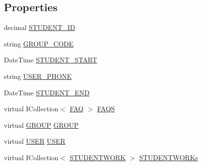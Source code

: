 \subsection*{Properties}
\begin{DoxyCompactItemize}
\item 
decimal \hyperlink{class_e_f_oracle_1_1_model_1_1_s_t_u_d_e_n_t_ac52552fb2577883bf22d24acd6263928}{S\+T\+U\+D\+E\+N\+T\+\_\+\+ID}
\item 
string \hyperlink{class_e_f_oracle_1_1_model_1_1_s_t_u_d_e_n_t_a03789daa6023e5873d86b9dde2c913a5}{G\+R\+O\+U\+P\+\_\+\+C\+O\+DE}
\item 
Date\+Time \hyperlink{class_e_f_oracle_1_1_model_1_1_s_t_u_d_e_n_t_ac98090401dae17df06850dedd8d20acf}{S\+T\+U\+D\+E\+N\+T\+\_\+\+S\+T\+A\+RT}
\item 
string \hyperlink{class_e_f_oracle_1_1_model_1_1_s_t_u_d_e_n_t_aade79c3e50cdf2b7756ab476b9cadea7}{U\+S\+E\+R\+\_\+\+P\+H\+O\+NE}
\item 
Date\+Time \hyperlink{class_e_f_oracle_1_1_model_1_1_s_t_u_d_e_n_t_ab80cc4d1a69f1a6fcc020a0b6edf608d}{S\+T\+U\+D\+E\+N\+T\+\_\+\+E\+ND}
\item 
virtual I\+Collection$<$ \hyperlink{class_e_f_oracle_1_1_model_1_1_f_a_q}{F\+AQ} $>$ \hyperlink{class_e_f_oracle_1_1_model_1_1_s_t_u_d_e_n_t_a48ab9bae6d7e36ac88346fbde34a618a}{F\+A\+QS}
\item 
virtual \hyperlink{class_e_f_oracle_1_1_model_1_1_g_r_o_u_p}{G\+R\+O\+UP} \hyperlink{class_e_f_oracle_1_1_model_1_1_s_t_u_d_e_n_t_a1082b5bfe750a1ab04c78c8e1240b8df}{G\+R\+O\+UP}
\item 
virtual \hyperlink{class_e_f_oracle_1_1_model_1_1_u_s_e_r}{U\+S\+ER} \hyperlink{class_e_f_oracle_1_1_model_1_1_s_t_u_d_e_n_t_a2b674831aaeeb5ebed3428dc914b3785}{U\+S\+ER}
\item 
virtual I\+Collection$<$ \hyperlink{class_e_f_oracle_1_1_model_1_1_s_t_u_d_e_n_t_w_o_r_k}{S\+T\+U\+D\+E\+N\+T\+W\+O\+RK} $>$ \hyperlink{class_e_f_oracle_1_1_model_1_1_s_t_u_d_e_n_t_a89d2c3eeab38f5a6a77fc5ddf997a16e}{S\+T\+U\+D\+E\+N\+T\+W\+O\+R\+Ks}
\end{DoxyCompactItemize}


